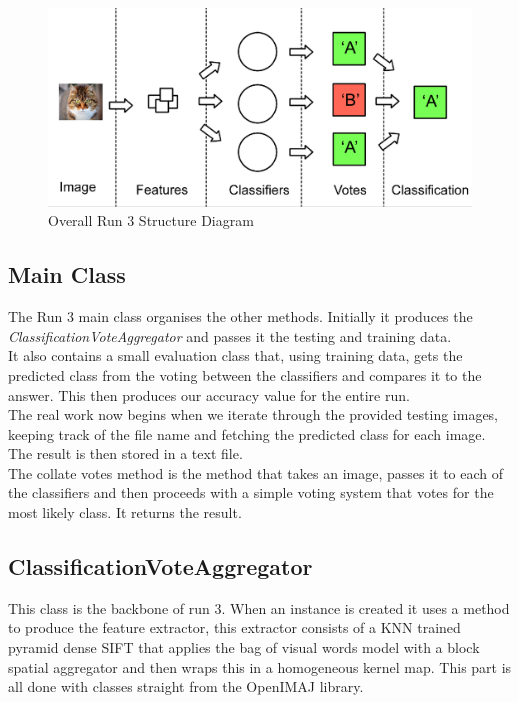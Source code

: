\documentclass{article}
\begin{document}
	\begin{figure}[h]
		\centering
		\includegraphics[scale=0.4]{structure}
		\caption{Overall Run 3 Structure Diagram}
	\end{figure}
	
	\subsection{Main Class}
	The Run 3 main class organises the other methods. Initially it produces the \textit{ClassificationVoteAggregator} and passes it the testing and training data.\\
	It also contains a small evaluation class that, using training data, gets the predicted class from the voting between the classifiers and compares it to the answer. This then produces our accuracy value for the entire run.\\
	The real work now begins when we iterate through the provided testing images, keeping track of the file name and fetching the predicted class for each image. The result is then stored in a text file.\\
	The collate votes method is the method that takes an image, passes it to each of the classifiers and then proceeds with a simple voting system that votes for the most likely class. It returns the result.
	
	\subsection{ClassificationVoteAggregator}
	This class is the backbone of run 3. When an instance is created it uses a method to produce the feature extractor, this extractor consists of a KNN trained pyramid dense SIFT that applies the bag of visual words model with a block spatial aggregator and then wraps this in a homogeneous kernel map. This part is all done with classes straight from the OpenIMAJ library.
	\newline
	
\end{document}

